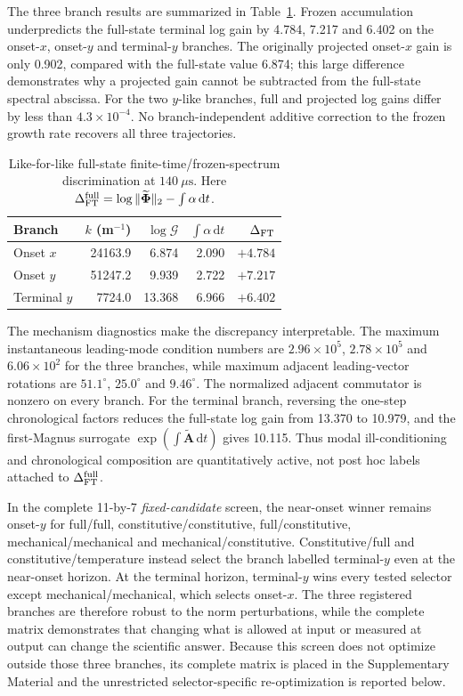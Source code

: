 The three branch results are summarized in Table~\ref{tab:ft_discrimination}. Frozen accumulation underpredicts the full-state terminal log gain by 4.784, 7.217 and 6.402 on the onset-$x$, onset-$y$ and terminal-$y$ branches. The originally projected onset-$x$ gain is only 0.902, compared with the full-state value 6.874; this large difference demonstrates why a projected gain cannot be subtracted from the full-state spectral abscissa. For the two $y$-like branches, full and projected log gains differ by less than $4.3\times10^{-4}$. No branch-independent additive correction to the frozen growth rate recovers all three trajectories.

\begin{table}[t]
\centering
\caption{Like-for-like full-state finite-time/frozen-spectrum discrimination at $140~\mu\mathrm s$. Here $\Delta_{\rm FT}^{\rm full}=\log\|\widetilde{\boldsymbol\Phi}\|_2-\int\alpha\,\mathrm dt$.}
\label{tab:ft_discrimination}
\begin{tabular}{@{}lrrrr@{}}
\toprule
Branch & $k$ (m$^{-1}$) & $\log\mathcal G$ & $\int\alpha\,\mathrm dt$ & $\Delta_{\rm FT}$\\
\midrule
Onset $x$ & 24163.9 & 6.874 & 2.090 & $+4.784$\\
Onset $y$ & 51247.2 & 9.939 & 2.722 & $+7.217$\\
Terminal $y$ & 7724.0 & 13.368 & 6.966 & $+6.402$\\
\bottomrule
\end{tabular}
\end{table}

The mechanism diagnostics make the discrepancy interpretable. The maximum
instantaneous leading-mode condition numbers are
$2.96\times10^5$, $2.78\times10^5$ and $6.06\times10^2$ for the three
branches, while maximum adjacent leading-vector rotations are
$51.1^\circ$, $25.0^\circ$ and $9.46^\circ$. The normalized adjacent
commutator is nonzero on every branch. For the terminal branch, reversing the
one-step chronological factors reduces the full-state log gain from 13.370 to
10.979, and the first-Magnus surrogate
$\exp(\int\widetilde{\boldsymbol A}\,\mathrm dt)$ gives 10.115. Thus modal
ill-conditioning and chronological composition are quantitatively active,
not post hoc labels attached to $\Delta_{\rm FT}^{\rm full}$.

In the complete 11-by-7 \emph{fixed-candidate} screen, the near-onset winner remains onset-$y$ for
full/full, constitutive/constitutive, full/constitutive,
mechanical/mechanical and mechanical/constitutive. Constitutive/full and
constitutive/temperature instead select the branch labelled terminal-$y$ even
at the near-onset horizon. At the terminal horizon, terminal-$y$ wins every
tested selector except mechanical/mechanical, which selects onset-$x$. The
three registered branches are therefore robust to the norm perturbations,
while the complete matrix demonstrates that changing what is allowed at input
or measured at output can change the scientific answer.  Because this screen
does not optimize outside those three branches, its complete matrix is placed
in the Supplementary Material and the unrestricted selector-specific
re-optimization is reported below.

